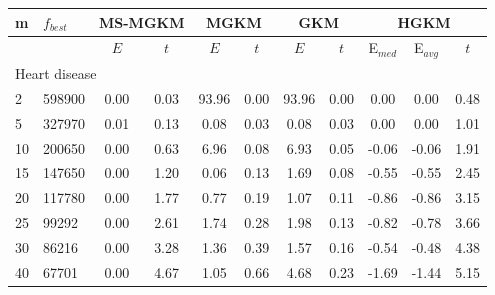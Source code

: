 {\footnotesize
\centering
\begin{longtable}{@{}llccccccccc@{}}
\hline
\multicolumn{1}{l|}{m}  & \multicolumn{1}{l|}{$f_{best}$} & \multicolumn{2}{c|}{MS-MGKM}      & \multicolumn{2}{c|}{MGKM}         & \multicolumn{2}{c|}{GKM}          & \multicolumn{3}{c}{HGKM}      \\ \hline
                        & \multicolumn{1}{l|}{}           & $E$  & \multicolumn{1}{c|}{$t$}   & $E$   & \multicolumn{1}{c|}{$t$}  & $E$   & \multicolumn{1}{c|}{$t$}  & E$_{med}$ & E$_{avg}$ & $t$   \\ \hline
\multicolumn{11}{l}{Heart disease}                                                                                                                                                                    \\ \hline
\multicolumn{1}{l|}{2}  & \multicolumn{1}{l|}{598900}     & 0.00 & \multicolumn{1}{c|}{0.03}  & 93.96 & \multicolumn{1}{c|}{0.00} & 93.96 & \multicolumn{1}{c|}{0.00} & 0.00      & 0.00      & 0.48  \\
\multicolumn{1}{l|}{5}  & \multicolumn{1}{l|}{327970}     & 0.01 & \multicolumn{1}{c|}{0.13}  & 0.08  & \multicolumn{1}{c|}{0.03} & 0.08  & \multicolumn{1}{c|}{0.03} & 0.00      & 0.00      & 1.01  \\
\multicolumn{1}{l|}{10} & \multicolumn{1}{l|}{200650}     & 0.00 & \multicolumn{1}{c|}{0.63}  & 6.96  & \multicolumn{1}{c|}{0.08} & 6.93  & \multicolumn{1}{c|}{0.05} & -0.06     & -0.06     & 1.91  \\
\multicolumn{1}{l|}{15} & \multicolumn{1}{l|}{147650}     & 0.00 & \multicolumn{1}{c|}{1.20}  & 0.06  & \multicolumn{1}{c|}{0.13} & 1.69  & \multicolumn{1}{c|}{0.08} & -0.55     & -0.55     & 2.45  \\
\multicolumn{1}{l|}{20} & \multicolumn{1}{l|}{117780}     & 0.00 & \multicolumn{1}{c|}{1.77}  & 0.77  & \multicolumn{1}{c|}{0.19} & 1.07  & \multicolumn{1}{c|}{0.11} & -0.86     & -0.86     & 3.15  \\
\multicolumn{1}{l|}{25} & \multicolumn{1}{l|}{99292}      & 0.00 & \multicolumn{1}{c|}{2.61}  & 1.74  & \multicolumn{1}{c|}{0.28} & 1.98  & \multicolumn{1}{c|}{0.13} & -0.82     & -0.78     & 3.66  \\
\multicolumn{1}{l|}{30} & \multicolumn{1}{l|}{86216}      & 0.00 & \multicolumn{1}{c|}{3.28}  & 1.36  & \multicolumn{1}{c|}{0.39} & 1.57  & \multicolumn{1}{c|}{0.16} & -0.54     & -0.48     & 4.38  \\
\multicolumn{1}{l|}{40} & \multicolumn{1}{l|}{67701}      & 0.00 & \multicolumn{1}{c|}{4.67}  & 1.05  & \multicolumn{1}{c|}{0.66} & 4.68  & \multicolumn{1}{c|}{0.23} & -1.69     & -1.44     & 5.15  \\

\end{longtable}}
